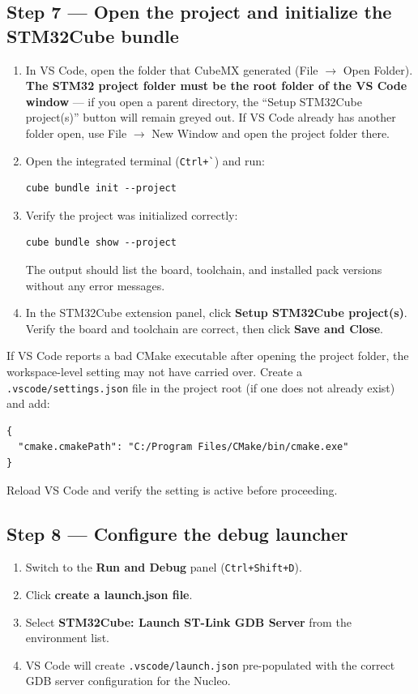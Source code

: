 \documentclass[11pt,letterpaper]{article}
\begin{document}
\subsection{Step 7 --- Open the project and initialize the STM32Cube bundle}
\begin{enumerate}[leftmargin=2em]
	\item In VS Code, open the folder that CubeMX generated (File $\to$ Open Folder). \textbf{The STM32 project folder must be the root folder of the VS Code window} --- if you open a parent directory, the ``Setup STM32Cube project(s)'' button will remain greyed out. If VS Code already has another folder open, use File $\to$ New Window and open the project folder there.
	\item Open the integrated terminal (\texttt{Ctrl+\`{}}) and run:
\begin{verbatim}
cube bundle init --project
\end{verbatim}
	\item Verify the project was initialized correctly:
\begin{verbatim}
cube bundle show --project
\end{verbatim}
	The output should list the board, toolchain, and installed pack versions without any error messages.
	\item In the STM32Cube extension panel, click \textbf{Setup STM32Cube project(s)}. Verify the board and toolchain are correct, then click \textbf{Save and Close}.
\end{enumerate}

\begin{tcolorbox}[infobox={If cmake.cmakePath is not recognized}]
	If VS Code reports a bad CMake executable after opening the project folder, the workspace-level setting may not have carried over. Create a \texttt{.vscode/settings.json} file in the project root (if one does not already exist) and add:
\begin{verbatim}
{
  "cmake.cmakePath": "C:/Program Files/CMake/bin/cmake.exe"
}
\end{verbatim}
	Reload VS Code and verify the setting is active before proceeding.
\end{tcolorbox}

\subsection{Step 8 --- Configure the debug launcher}
\begin{enumerate}[leftmargin=2em]
	\item Switch to the \textbf{Run and Debug} panel (\texttt{Ctrl+Shift+D}).
	\item Click \textbf{create a launch.json file}.
	\item Select \textbf{STM32Cube: Launch ST-Link GDB Server} from the environment list.
	\item VS Code will create \texttt{.vscode/launch.json} pre-populated with the correct GDB server configuration for the Nucleo.
\end{enumerate}
\end{document}
